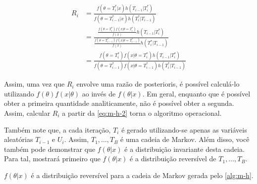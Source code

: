 \begin{align}
 \label{eq:m-h-2}
 R_i &=\frac{f(\theta=T_i^{*}|x)h(T_{i-1}|T_{i}^*)}
 {f(\theta=T_{i-1}^{*}|x)h(T_{i}^*|T_{i-1})} \nonumber \\
 &=\frac{\frac{f(\theta=T_i^{*})f(x|\theta=T_i^*)}{f(x)}h(T_{i-1}|T_{i}^*)}{\frac{f(\theta=T_{i-1}^{*})f(x|\theta=T_{i-1}^{*})}{f(x)}h(T_{i}^*|T_{i-1})} \nonumber \\
 &= \frac{f(\theta=T_i^{*})f(x|\theta=T_i^*)h(T_{i-1}|T_{i}^*)}{f(\theta=T_{i-1}^{*})f(x|\theta=T_{i-1}^{*})h(T_{i}^*|T_{i-1})}
\end{align}

Assim, uma vez que $R_i$ envolve uma razão de
posterioris, é possível calculá-lo utilizando
$f(\theta)f(x|\theta)$ ao invés de $f(\theta|x)$.
Em geral, enquanto que é possível obter a primeira quantidade analiticamente, não é possível obter a segunda. Assim, calcular $R_i$ a partir da 
\cref{eq:m-h-2} torna o algoritmo operacional.

Também note que, a cada iteração, $T_i$ é gerado
utilizando-se apenas as variáveis aleatórias
$T_{i-1}$ e $U_{i}$. Assim,
$T_{1},\ldots,T_{B}$ é uma cadeia de Markov.
Além disso, você também pode demonstrar que
$f(\theta|x)$ é a distribuição invariante 
desta cadeia.
Para tal, mostrará primeiro que 
$f(\theta|x)$ é a distribuição reversível de
$T_{1},\ldots,T_{B}$.

\begin{lemma}
 \label{lemma:mh-reversible}
 $f(\theta|x)$ é a distribuição reversível para
 a cadeia de Markov gerada pelo \cref{alg:m-h}.
\end{lemma}

